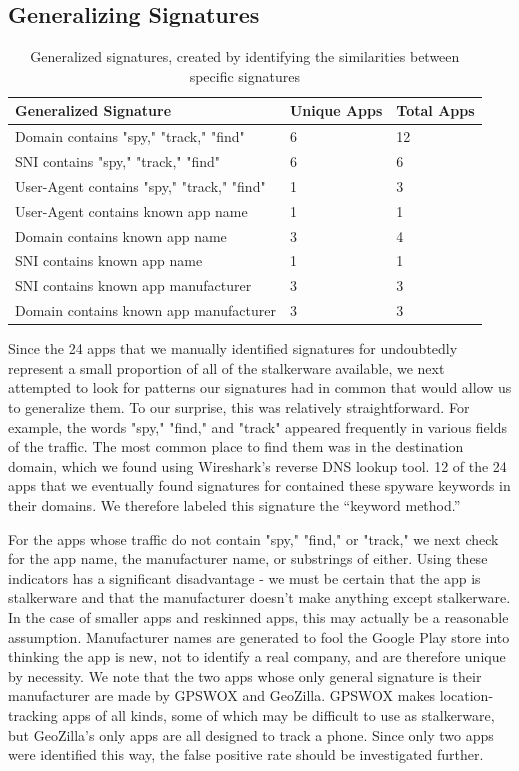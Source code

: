 \documentclass[acmtog]{acmart}
\begin{document}
\subsection{Generalizing Signatures}
\begin{table}
	\begin{tabular}{p{6cm}p{4cm}p{4cm}}
		\toprule
		Generalized Signature & Unique Apps & Total Apps \\
		\hline
		Domain contains "spy," "track," "find" & 6 & 12 \\
		SNI contains "spy," "track," "find" & 6 & 6 \\
		User-Agent contains "spy," "track," "find" & 1 & 3 \\
		User-Agent contains known app name & 1 & 1 \\
		Domain contains known app name & 3 & 4 \\
		SNI contains known app name & 1 & 1 \\
		SNI contains known app manufacturer & 3 & 3 \\
		Domain contains known app manufacturer & 3 & 3 \\
		\midrule
	\end{tabular}
	\caption{Generalized signatures, created by identifying the similarities 
		between specific signatures}
	\label{tab:gen}
\end{table}
Since the 24 apps that we manually identified signatures for undoubtedly 
represent a small proportion of all of the stalkerware available, we next 
attempted to look for patterns our signatures had in common that would allow us 
to generalize them. To our surprise, this was relatively straightforward.  
For example, the words "spy," "find," and "track" appeared frequently in 
various fields of the traffic. The most common place to find them was in the 
destination domain, which we found using Wireshark's reverse DNS lookup tool. 
12 of the 24 apps that we eventually found signatures for contained these 
spyware keywords in their domains. We therefore labeled this signature the 
``keyword method.''

For the apps whose traffic do not contain "spy," "find," or "track," we 
next check for the app name, the manufacturer name, or substrings of either. 
Using these indicators has a significant disadvantage - we must be certain that 
the app is stalkerware and that the manufacturer doesn't make anything except 
stalkerware. In the case of smaller apps and reskinned apps, this may actually 
be a reasonable assumption. Manufacturer names are generated to fool the 
Google Play store into thinking the app is new, not to identify a real company, 
and are therefore unique by necessity. We note that the two apps whose only 
general signature is their manufacturer are made by GPSWOX and GeoZilla. GPSWOX 
makes 
location-tracking apps of all kinds, some of which may be difficult to use as 
stalkerware, but GeoZilla's only apps are all designed to track a phone. Since 
only two apps were identified this way, the false positive rate should be 
investigated further. 
\end{document}
